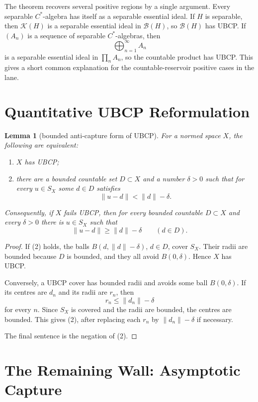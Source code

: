 \documentclass[11pt]{article}
\newtheorem{lemma}{Lemma}
\begin{document}
The theorem recovers several positive regions by a single argument.
Every separable \(C^*\)-algebra has itself as a separable essential ideal.
If \(H\) is separable, then \(\mathcal K(H)\) is a separable essential ideal
in \(\mathcal B(H)\), so \(\mathcal B(H)\) has UBCP.  If \((A_n)\) is a
sequence of separable \(C^*\)-algebras, then
\[
        \bigoplus_{n=1}^\infty A_n
\]
is a separable essential ideal in \(\prod_n A_n\), so the countable product
has UBCP.  This gives a short common explanation for the countable-reservoir
positive cases in the lane.

\section*{Quantitative UBCP Reformulation}

\begin{lemma}[bounded anti-capture form of UBCP]
\label{lem:anti}
For a normed space \(X\), the following are equivalent:
\begin{enumerate}
    \item \(X\) has UBCP;
    \item there are a bounded countable set \(D\subset X\) and a number
          \(\delta>0\) such that for every \(u\in S_X\) some \(d\in D\)
          satisfies
          \[
                \|u-d\|<\|d\|-\delta .
          \]
\end{enumerate}
Consequently, if \(X\) fails UBCP, then for every bounded countable
\(D\subset X\) and every \(\delta>0\) there is \(u\in S_X\) such that
\[
        \|u-d\|\ge \|d\|-\delta \qquad(d\in D).
\]
\end{lemma}

\begin{proof}
If (2) holds, the balls \(B(d,\|d\|-\delta)\), \(d\in D\), cover \(S_X\).
Their radii are bounded because \(D\) is bounded, and they all avoid
\(B(0,\delta)\).  Hence \(X\) has UBCP.

Conversely, a UBCP cover has bounded radii and avoids some ball
\(B(0,\delta)\).  If its centres are \(d_n\) and its radii are \(r_n\), then
\[
        r_n\le \|d_n\|-\delta
\]
for every \(n\).  Since \(S_X\) is covered and the radii are bounded, the
centres are bounded.  This gives (2), after replacing each \(r_n\) by
\(\|d_n\|-\delta\) if necessary.

The final sentence is the negation of (2).
\end{proof}

\section*{The Remaining Wall: Asymptotic Capture}
\end{document}
